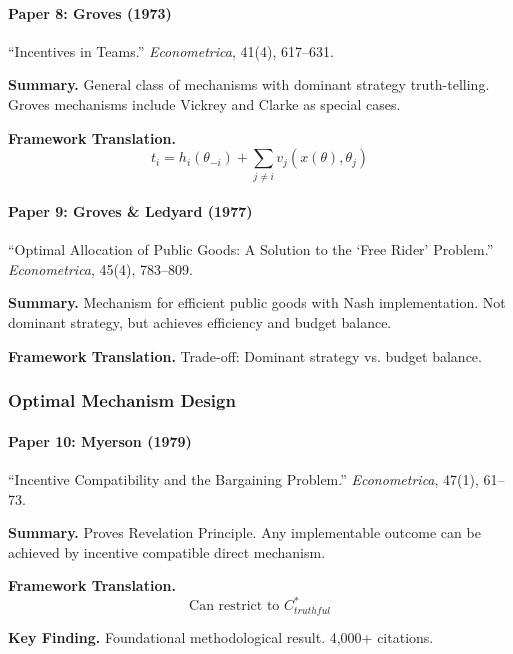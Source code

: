 \paragraph{Paper 8: Groves (1973)}

``Incentives in Teams.''
\textit{Econometrica}, 41(4), 617--631.

\textbf{Summary.}
General class of mechanisms with dominant strategy truth-telling.
Groves mechanisms include Vickrey and Clarke as special cases.

\textbf{Framework Translation.}
\begin{equation}
t_i = h_i(\theta_{-i}) + \sum_{j \neq i} v_j(x(\theta), \theta_j)
\end{equation}

\paragraph{Paper 9: Groves \& Ledyard (1977)}

``Optimal Allocation of Public Goods: A Solution to the `Free Rider' Problem.''
\textit{Econometrica}, 45(4), 783--809.

\textbf{Summary.}
Mechanism for efficient public goods with Nash implementation.
Not dominant strategy, but achieves efficiency and budget balance.

\textbf{Framework Translation.}
Trade-off: Dominant strategy vs. budget balance.

\subsubsection{Optimal Mechanism Design}

\paragraph{Paper 10: Myerson (1979)}

``Incentive Compatibility and the Bargaining Problem.''
\textit{Econometrica}, 47(1), 61--73.

\textbf{Summary.}
Proves Revelation Principle. Any implementable outcome can be achieved 
by incentive compatible direct mechanism.

\textbf{Framework Translation.}
\begin{equation}
\text{Can restrict to } C^*_{truthful}
\end{equation}

\textbf{Key Finding.}
Foundational methodological result. 4,000+ citations.

